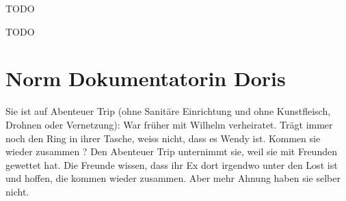 \begin{npcBox}[title=Wendy]
    \begin{consequences}
    \item {}
    \item {}
    \item {}
    \end{consequences}

    \begin{npcDescription}
    TODO
    \end{npcDescription}


    \begin{equipment}
    \item TODO
    \end{equipment}
\end{npcBox}
\newpage

\section{Norm Dokumentatorin Doris}
Sie ist auf Abenteuer Trip (ohne Sanitäre Einrichtung und ohne Kunstfleisch, Drohnen oder Vernetzung): War früher mit Wilhelm verheiratet. Trägt immer noch den Ring in ihrer Tasche, weiss nicht, dass es Wendy ist. Kommen sie wieder zusammen ?
Den Abenteuer Trip unternimmt sie, weil sie mit Freunden gewettet hat. Die Freunde wissen, dass ihr Ex dort irgendwo unter den Lost ist  und hoffen, die kommen wieder zusammen. Aber mehr Ahnung haben sie selber nicht.

